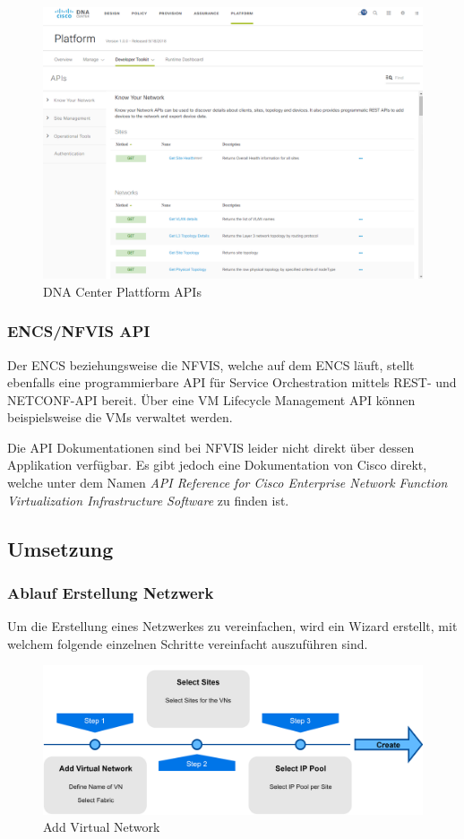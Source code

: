 \begin{figure}[H]
	\centering
	\includegraphics[width=0.8\linewidth]{img/Abstrahierung/dnac-apis}
	\caption{DNA Center Plattform APIs}
	\label{fig:DNA Center Plattform APIs}
\end{figure}

\subsubsection{ENCS/NFVIS API}
Der ENCS beziehungsweise die NFVIS, welche auf dem ENCS läuft, stellt ebenfalls eine programmierbare API für Service Orchestration mittels REST- und NETCONF-API bereit. Über eine VM Lifecycle Management API können beispielsweise die VMs verwaltet werden.

Die API Dokumentationen sind bei NFVIS leider nicht direkt über dessen Applikation verfügbar. Es gibt jedoch eine Dokumentation von Cisco direkt, welche unter dem Namen \textit{API Reference for Cisco Enterprise Network Function Virtualization Infrastructure Software} \cite{nfvis-api} zu finden ist.


\subsection{Umsetzung}

\subsubsection{Ablauf Erstellung Netzwerk}
Um die Erstellung eines Netzwerkes zu vereinfachen, wird ein Wizard erstellt, mit welchem folgende einzelnen Schritte vereinfacht auszuführen sind. 

\begin{figure}[H]
	\centering
	\includegraphics[width=0.8\linewidth]{img/Abstrahierung/addvirtualnetwork}
	\caption{Add Virtual Network}
	\label{fig:Add Virtual Network}
\end{figure}

